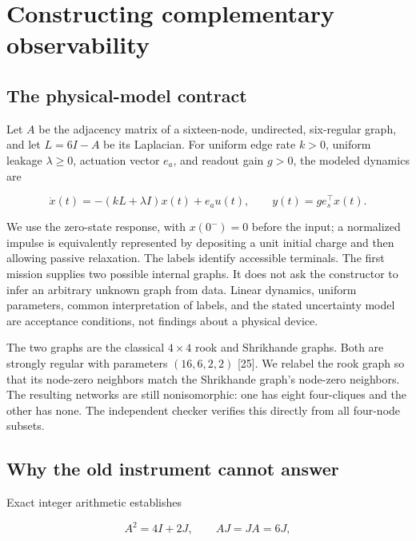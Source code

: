 \documentclass[
  11pt,
]{article}
\begin{document}
\hypertarget{constructing-complementary-observability}{%
\section{Constructing complementary
observability}\label{constructing-complementary-observability}}

\hypertarget{the-physical-model-contract}{%
\subsection{The physical-model
contract}\label{the-physical-model-contract}}

Let \(A\) be the adjacency matrix of a sixteen-node, undirected,
six-regular graph, and let \(L=6I-A\) be its Laplacian. For uniform edge
rate \(k>0\), uniform leakage \(\lambda\geq0\), actuation vector
\(e_a\), and readout gain \(g>0\), the modeled dynamics are

\[\dot x(t)=-(kL+\lambda I)x(t)+e_a u(t), \qquad y(t)=g e_s^\top x(t).\]

We use the zero-state response, with \(x(0^-)=0\) before the input; a
normalized impulse is equivalently represented by depositing a unit
initial charge and then allowing passive relaxation. The labels identify
accessible terminals. The first mission supplies two possible internal
graphs. It does not ask the constructor to infer an arbitrary unknown
graph from data. Linear dynamics, uniform parameters, common
interpretation of labels, and the stated uncertainty model are
acceptance conditions, not findings about a physical device.

The two graphs are the classical \(4\times4\) rook and Shrikhande
graphs. Both are strongly regular with parameters \((16,6,2,2)\)
{[}25{]}. We relabel the rook graph so that its node-zero neighbors
match the Shrikhande graph's node-zero neighbors. The resulting networks
are still nonisomorphic: one has eight four-cliques and the other has
none. The independent checker verifies this directly from all four-node
subsets.

\hypertarget{why-the-old-instrument-cannot-answer}{%
\subsection{Why the old instrument cannot
answer}\label{why-the-old-instrument-cannot-answer}}

Exact integer arithmetic establishes

\[A^2=4I+2J, \qquad AJ=JA=6J,\]
\end{document}
